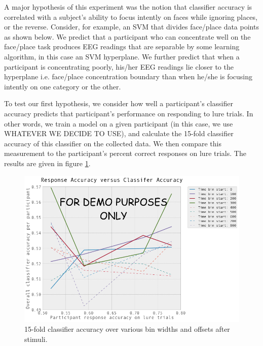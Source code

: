 \documentclass[11pt]{report}
\begin{document}
A major hypothesis of this experiment was the notion that classifier accuracy is correlated with a subject's ability to focus intently on faces while ignoring places, or the reverse.  Consider, for example, an SVM that divides face/place data points as shown below.  We predict that a participant who can concentrate well on the face/place task produces EEG readings that are separable by some learning algorithm, in this case an SVM hyperplane.  We further predict that when a participant is concentrating poorly, his/her EEG readings lie closer to the hyperplane i.e. face/place concentration boundary than when he/she is focusing intently on one category or the other.  

To test our first hypothesis, we consider how well a participant's classifier accuracy predicts that participant's performance on responding to lure trials.  In other words, we train a model on a given participant (in this case, we use WHATEVER WE DECIDE TO USE), and calculate the 15-fold classifier accuracy of this classifier on the collected data.  We then compare this measurement to the participant's percent correct responses on lure trials.  The results are given in figure \ref{responsevsclass}.

\begin{figure}[t]
\centering
\includegraphics[width=5.5in]{response_acc_vs_class_acc}
\caption{15-fold classifier accuracy over various bin widths and offsets after stimuli.\label{responsevsclass}}
\end{figure}
\end{document}
